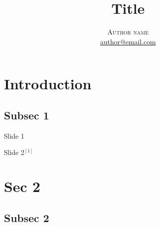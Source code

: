\documentclass[t, 10pt, hideothersubsections, notes]{beamer}
\title[Title in footer]
{Title}
\author[Author name in footer]
{      
    \centering         
    \normalsize
    \textsc{Author name}\\
    \small
    \textcolor{teal}{\url{author@email.com}}\\[1.5em]
}
\date[date]
\institute[affiliation in footer]
{
    Affiliation
}
\begin{document}


\begin{frame}[plain]
    \titlepage
\end{frame}




\section{Introduction}


\subsection{Subsec 1}

\begin{frame}{Slide 1}

\end{frame}


\begin{frame}{Slide 2$^{[1]}$}


\end{frame}


\section{Sec 2}


\subsection{Subsec 2}
\end{document}
